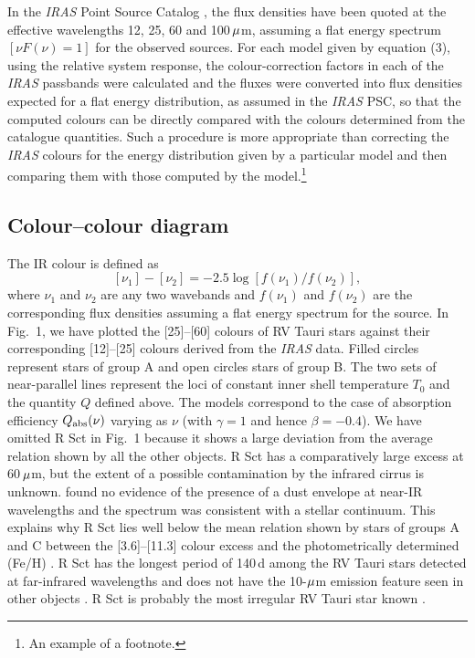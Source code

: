 \documentclass[useAMS,usenatbib]{mn2e}
\begin{document}
In the {\it IRAS\/} Point Source Catalog \citep[PSC,][]{b2}, the
flux densities have been quoted at the effective wavelengths 12,
25, 60 and \hbox{100\,$\mu$m}, assuming a flat energy spectrum
$[\nu F(\nu)=1]$ for the observed sources. For each model given by
equation (3), using the relative system response, the
colour-correction factors \citep{b3} in each of the {\it IRAS\/}
passbands were calculated and the fluxes were converted into flux
densities expected for a flat energy distribution, as assumed in
the {\it IRAS\/} PSC, so that the computed colours can be directly
compared with the colours determined from the catalogue
quantities. Such a procedure is more appropriate than correcting
the {\it IRAS\/} colours for the energy distribution given by a
particular model and then comparing them with those computed by
the model.\footnote{An example of a footnote.}

\subsection{Colour--colour diagram}

The IR colour is defined as
\[
  [\nu_1]-[\nu_2]=-2.5\log [f(\nu_1)/f(\nu_2)],
\]
 where $\nu_1$ and $\nu_2$ are any two wavebands and $f(\nu_1)$
and $f(\nu_2)$ are the corresponding flux  densities assuming a
flat energy spectrum for the source. In Fig.~1, we have plotted
the [25]--[60] colours  of RV Tauri stars against their
corresponding [12]--[25]  colours derived from the {\it IRAS\/}
data. Filled circles  represent stars of group A and open circles
stars of group B. The two sets of near-parallel lines represent
the loci of constant inner shell temperature $T_0$ and the
quantity $Q$ defined above. The models correspond to the case of
absorption efficiency $Q_{{\mathrm{abs}}}(\nu)$ varying as $\nu$ (with
$\gamma=1$ and hence $\beta=-0.4$). We have omitted R Sct in
Fig.~1 because it shows a large deviation from the average
relation shown by all the other objects. R Sct has a comparatively
large excess at 60$\,\mu$m, but the extent of a possible
contamination by the infrared cirrus \citep{b16} is unknown.
\citet{b9} found no evidence of the presence of a dust envelope at
near-IR wavelengths and the spectrum was consistent with a stellar
continuum. This explains why R Sct lies well below the mean
relation shown by stars of groups A and C between the
[3.6]--[11.3] colour excess and the photometrically determined
(Fe/H) \citep{b4}. R Sct has the longest period of 140$\,$d among
the RV Tauri stars detected at far-infrared wavelengths and does
not have the 10-$\mu$m emission feature seen in other objects
\citep{b5,b19}. R Sct is probably the most irregular RV Tauri star
known \citep{b17}.
\end{document}
